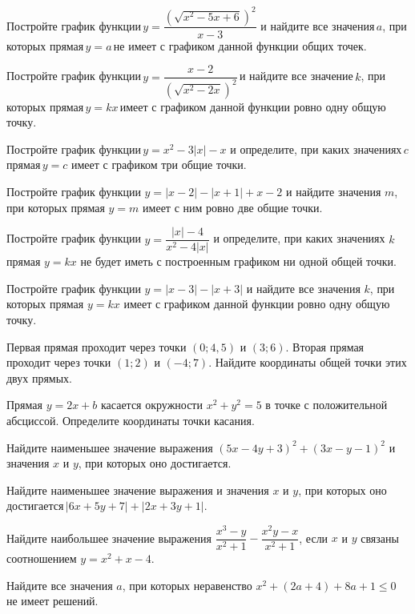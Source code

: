 \begin{class}[number=5]
	\begin{listofex}
		\item Постройте график функции \( y=\dfrac{(\sqrt{x^2-5x+6})^2}{x-3} \) и найдите все значения \( a \), при которых прямая \( y=a \) не имеет с графиком данной функции общих точек.
		\item Постройте график функции \( y=\dfrac{x-2}{(\sqrt{x^2-2x})^2} \) и найдите все значение \( k \), при которых прямая \( y=kx \) имеет с графиком данной функции ровно одну общую точку.
		\item Постройте график функции \( y=x^2-3|x|-x \) и определите, при каких значениях \( c \) прямая \( y=c \) имеет с графиком три общие точки.
		\item Постройте график функции \( y=|x-2|-|x+1|+x-2 \) и найдите значения \( m \), при которых прямая \( y=m \) имеет с ним ровно две общие точки.
		\item Постройте график функции \( y=\dfrac{|x|-4}{x^2-4|x|} \) и определите, при каких значениях \( k \) прямая \( y=kx \) не будет иметь с построенным графиком ни одной общей точки.
		\item Постройте график функции \( y=|x-3|-|x+3| \) и найдите все значения \( k \), при которых прямая \( y=kx \) имеет с графиком данной функции ровно одну общую точку.
	\end{listofex}
\end{class}

\begin{class}[number=6]
	\begin{listofex}
		\item Первая прямая проходит через точки \( (0; 4,5) \) и \( (3; 6) \). Вторая прямая проходит через точки \( (1;2) \) и \( (-4;7) \). Найдите координаты общей точки этих двух прямых.
		\item Прямая \( y=2x+b \) касается окружности \( x^2+y^2=5 \) в точке с положительной абсциссой. Определите координаты точки касания.
		\item Найдите наименьшее значение выражения \( (5x-4y+3)^2+(3x-y-1)^2 \) и значения \( x \) и \( y \), при которых оно достигается.
		\item Найдите наименьшее значение выражения и значения \( x \) и \( y \), при которых оно достигается \( |6x+5y+7|+|2x+3y+1| \).
		\item Найдите наибольшее значение выражения \( \dfrac{x^3-y}{x^2+1}-\dfrac{x^2y-x}{x^2+1} \),  если \( x \) и \( y \) связаны соотношением \( y=x^2+x-4 \).
		\item Найдите все значения \( a \), при которых неравенство \( x^2+(2a+4)+8a+1\le0 \) не имеет решений.
	\end{listofex}
\end{class}

